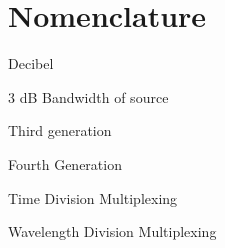 


\chapter*{Nomenclature}
%

\begin{description}
\item{}  Decibel
\item{} 3 dB Bandwidth of source
\item{} Third generation
\item{} Fourth Generation
\item{} Time Division Multiplexing
\item{} Wavelength Division Multiplexing
\end{description}
